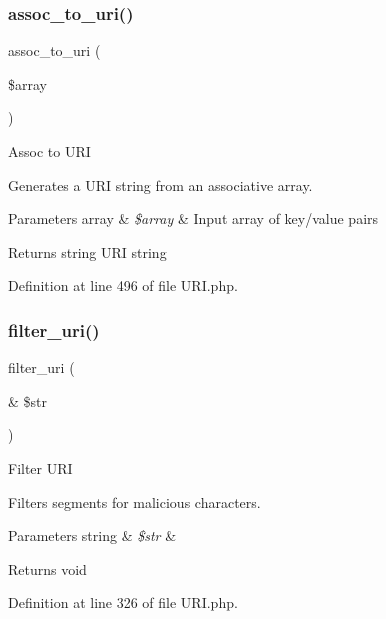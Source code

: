 \subsubsection{\texorpdfstring{assoc\_to\_uri()}{assoc\_to\_uri()}}
{\footnotesize\ttfamily assoc\+\_\+to\+\_\+uri (\begin{DoxyParamCaption}\item[{}]{\$array }\end{DoxyParamCaption})}

Assoc to U\+RI

Generates a U\+RI string from an associative array.


\begin{DoxyParams}[1]{Parameters}
array & {\em \$array} & Input array of key/value pairs \\
\hline
\end{DoxyParams}
\begin{DoxyReturn}{Returns}
string U\+RI string 
\end{DoxyReturn}


Definition at line 496 of file U\+R\+I.\+php.

\mbox{\label{class_c_i___u_r_i_a0449aea4e186717ecbf1eacfc59fc5b6}} 
\subsubsection{\texorpdfstring{filter\_uri()}{filter\_uri()}}
{\footnotesize\ttfamily filter\+\_\+uri (\begin{DoxyParamCaption}\item[{\&}]{\$str }\end{DoxyParamCaption})}

Filter U\+RI

Filters segments for malicious characters.


\begin{DoxyParams}[1]{Parameters}
string & {\em \$str} & \\
\hline
\end{DoxyParams}
\begin{DoxyReturn}{Returns}
void 
\end{DoxyReturn}


Definition at line 326 of file U\+R\+I.\+php.

\mbox{\label{class_c_i___u_r_i_a0fbd875ee8f8965b0b495b1dce0080fb}} 
